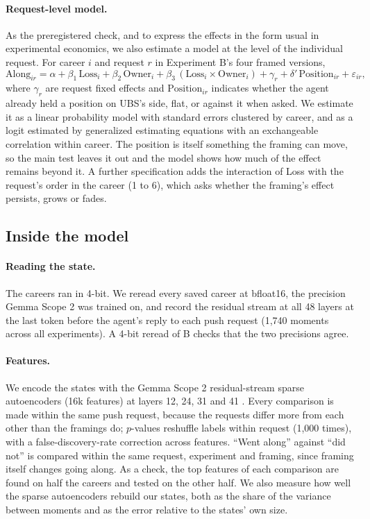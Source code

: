 \documentclass[11pt]{article}
\begin{document}
\paragraph{Request-level model.} As the preregistered check, and to express the effects in the form usual in
experimental economics, we also estimate a model at the level of the individual request. For career $i$ and request $r$
in Experiment B's four framed versions,
\begin{equation}
\text{Along}_{ir} = \alpha + \beta_1\,\text{Loss}_i + \beta_2\,\text{Owner}_i + \beta_3\,(\text{Loss}_i \times
\text{Owner}_i) + \gamma_r + \delta'\,\text{Position}_{ir} + \varepsilon_{ir},
\label{eq:lpm}
\end{equation}
where $\gamma_r$ are request fixed effects and $\text{Position}_{ir}$ indicates whether the agent already held a position
on UBS's side, flat, or against it when asked. We estimate it as a linear probability model with standard errors
clustered by career, and as a logit estimated by generalized estimating equations with an exchangeable correlation within
career. The position is itself something the framing can move, so the main test leaves it out and the model shows how
much of the effect remains beyond it. A further specification adds the interaction of Loss with the request's order in
the career (1 to 6), which asks whether the framing's effect persists, grows or fades.

\subsection{Inside the model}
\label{sec:insidemethods}

\paragraph{Reading the state.} The careers ran in 4-bit. We reread every saved career at bfloat16, the precision Gemma
Scope 2 was trained on, and record the residual stream at all 48 layers at the last token before the agent's reply to
each push request (1,740 moments across all experiments). A 4-bit reread of B checks that the two precisions agree.

\paragraph{Features.} We encode the states with the Gemma Scope 2 residual-stream sparse autoencoders (16k features) at
layers 12, 24, 31 and 41 \citep{mcdougall2025}. Every comparison is made within the same push request, because the
requests differ more from each other than the framings do; $p$-values reshuffle labels within request (1,000 times),
with a false-discovery-rate correction across features. ``Went along'' against ``did not'' is compared within the same
request, experiment and framing, since framing itself changes going along. As a check, the top features of each comparison are
found on half the careers and tested on the other half. We also measure how well the sparse autoencoders rebuild our
states, both as the share of the variance between moments and as the error relative to the states' own size.
\end{document}
